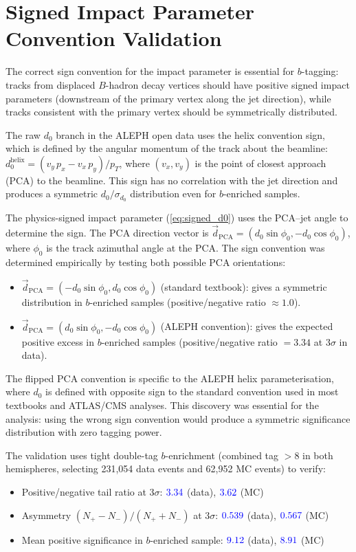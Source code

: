 \documentclass[11pt,a4paper]{article}
\newcommand{\measured}[1]{\textcolor{blue}{#1}}
\begin{document}
\section{Signed Impact Parameter Convention Validation}
\label{app:d0_sign_detail}

The correct sign convention for the impact parameter is essential
for $b$-tagging: tracks from displaced $B$-hadron decay vertices
should have positive signed impact parameters (downstream of the
primary vertex along the jet direction), while tracks consistent
with the primary vertex should be symmetrically distributed.

The raw $d_0$ branch in the ALEPH open data uses the helix
convention sign, which is defined by the angular momentum of the
track about the beamline:
$d_0^\text{helix} = (v_y\,p_x - v_x\,p_y) / p_T$, where
$(v_x, v_y)$ is the point of closest approach (PCA) to the
beamline.
This sign has no correlation with the jet direction and produces
a symmetric $d_0/\sigma_{d_0}$ distribution even for $b$-enriched
samples.

The physics-signed impact parameter (\cref{eq:signed_d0}) uses the
PCA--jet angle to determine the sign.
The PCA direction vector is
$\vec{d}_\text{PCA} = (d_0\sin\phi_0, -d_0\cos\phi_0)$, where
$\phi_0$ is the track azimuthal angle at the PCA.
The sign convention was determined empirically by testing both
possible PCA orientations:
\begin{itemize}
\item $\vec{d}_\text{PCA} = (-d_0\sin\phi_0, d_0\cos\phi_0)$
  (standard textbook): gives a symmetric distribution in
  $b$-enriched samples (positive/negative ratio $\approx 1.0$).
\item $\vec{d}_\text{PCA} = (d_0\sin\phi_0, -d_0\cos\phi_0)$
  (ALEPH convention): gives the expected positive excess in
  $b$-enriched samples (positive/negative ratio $= 3.34$ at
  $3\sigma$ in data).
\end{itemize}

The flipped PCA convention is specific to the ALEPH helix
parameterisation, where $d_0$ is defined with opposite sign
to the standard convention used in most textbooks and ATLAS/CMS
analyses.
This discovery was essential for the analysis: using the wrong
sign convention would produce a symmetric significance
distribution with zero tagging power.

The validation uses tight double-tag $b$-enrichment (combined
tag $> 8$ in both hemispheres, selecting 231,054 data events and
62,952 MC events) to verify:
\begin{itemize}
\item Positive/negative tail ratio at $3\sigma$:
  $\measured{3.34}$ (data), $\measured{3.62}$ (MC)
\item Asymmetry $(N_+ - N_-)/(N_+ + N_-)$ at $3\sigma$:
  $\measured{0.539}$ (data), $\measured{0.567}$ (MC)
\item Mean positive significance in $b$-enriched sample:
  $\measured{9.12}$ (data), $\measured{8.91}$ (MC)
\end{itemize}
\end{document}
